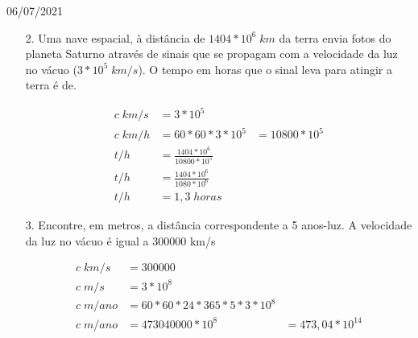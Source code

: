 \documentclass{SchoolBook}
\begin{document}
\begin{day}{06/07/2021}
\begin{enumerate}
            \item[2.] Uma nave espacial, à distância de $1404 * 10^6\;km$ da terra envia fotos do planeta Saturno através de sinais que se propagam com a velocidade da luz no vácuo ($3 * 10^5\;km/s$). O tempo em horas que o sinal leva para atingir a terra é de.
            
            \begin{align*}
                c\;km/s &= 3  *          10^5                 \\
                c\;km/h &= 60 * 60 * 3 * 10^5 &= 10800 * 10^5 \\[3pt]
                t    /h &= \frac{1404 * 10^6}{10800 * 10^5} \\
                t    /h &= \frac{1404 * 10^6}{1080 * 10^6}  \\
                t    /h &= 1,3\;horas
            \end{align*}
            
            \item[3.] Encontre, em metros, a distância correspondente a 5 anos-luz. A velocidade da luz no vácuo é igual a 300000 km/s
            
            \begin{align*}
                 c\;km/s   &= 300000                            \\
                 c\; m/s   &= 3  *                         10^8 \\
                 c\; m/ano &= 60 * 60 * 24 * 365 * 5 * 3 * 10^8 \\[3pt]
                 c\; m/ano &= 473040000                  * 10^8 &= 473,04 * 10^14
            \end{align*}
        \end{enumerate}
    \end{day}
\end{document}
